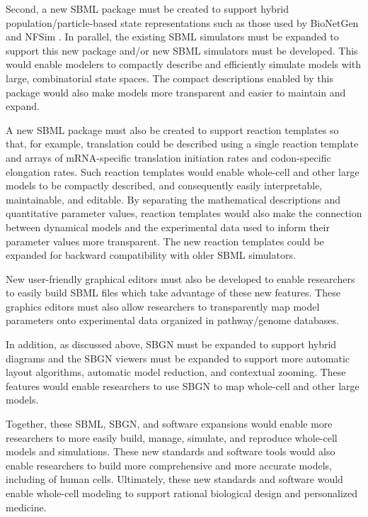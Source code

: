 \documentclass[journal,transmag]{IEEEtran}
\begin{document}
Second, a new SBML package must be created to support hybrid population/particle-based state representations such as those used by BioNetGen \cite{Hlavacek2006, Hogg2014} and NFSim \cite{Sneddon2011}. In parallel, the existing SBML simulators must be expanded to support this new package and/or new SBML simulators must be developed. This would enable modelers to compactly describe and efficiently simulate models with large, combinatorial state spaces. The compact descriptions enabled by this package would also make models more transparent and easier to maintain and expand. 

A new SBML package must also be created to support reaction templates so that, for example, translation could be described using a single reaction template and arrays of mRNA-specific translation initiation rates and codon-specific elongation rates. Such reaction templates would enable whole-cell and other large models to be compactly described, and consequently easily interpretable, maintainable, and editable. By separating the mathematical descriptions and quantitative parameter values, reaction templates would also make the connection between dynamical models and the experimental data used to inform their parameter values more transparent. The new reaction templates could be expanded for backward compatibility with older SBML simulators.

New user-friendly graphical editors must also be developed to enable researchers to easily build SBML files which take advantage of these new features. These graphics editors must also allow researchers to transparently map model parameters onto experimental data organized in pathway/genome databases.

In addition, as discussed above, SBGN must be expanded to support hybrid diagrams and the SBGN viewers must be expanded to support more automatic layout algorithms, automatic model reduction, and contextual zooming. These features would enable researchers to use SBGN to map whole-cell and other large models.

Together, these SBML, SBGN, and software expansions would enable more researchers to more easily build, manage, simulate, and reproduce whole-cell models and simulations. These new standards and software tools would also enable researchers to build more comprehensive and more accurate models, including of human cells. Ultimately, these new standards and software would enable whole-cell modeling to support rational biological design and personalized medicine.
\end{document}
